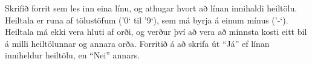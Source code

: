 \begin{problem}
	Skrifið forrit sem les inn eina línu, og athugar hvort að línan innihaldi heiltölu. Heiltala er runa af tölustöfum ('0` til '9`), sem má byrja á einum mínus ('-`). Heiltala má ekki vera hluti af orði, og verður því að vera að minnsta kosti eitt bil á milli heiltölunnar og annara orða. Forritið á að skrifa út "`Já"' ef línan inniheldur heiltölu, en "`Nei"' annars.

\begin{example}
%
\end{example}

\begin{example}
%
\end{example}

\begin{example}
%
\end{example}

\begin{example}
%
\end{example}
\end{problem}